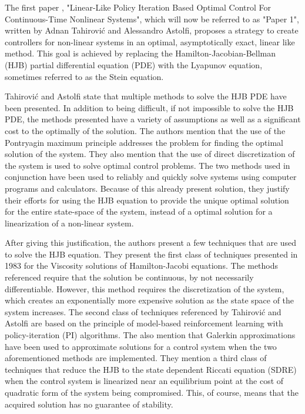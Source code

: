 \documentclass{IEEEtran}
\begin{document}
The first paper \cite{9029697}, "Linear-Like Policy Iteration Based Optimal Control For Continuous-Time Nonlinear Systems", which will now be referred to as "Paper 1", written by Adnan Tahirović and Alessandro Astolfi, proposes a strategy to create controllers for non-linear systems in an optimal, asymptotically exact, linear like method. This goal is achieved by replacing the Hamilton-Jacobian-Bellman (HJB) partial differential equation (PDE) with the Lyapunov equation, sometimes referred to as the Stein equation.

Tahirović and Astolfi state that multiple methods to solve the HJB PDE have been presented. In addition to being difficult, if not impossible to solve the HJB PDE, the methods presented have a variety of assumptions as well as a significant cost to the optimally of the solution. The authors mention that the use of the Pontryagin maximum principle addresses the problem for finding the optimal solution of the system. They also mention that the use of direct discretization of the system is used to solve optimal control problems. The two methods used in conjunction have been used to reliably and quickly solve systems using computer programs and calculators. Because of this already present solution, they justify their efforts for using the HJB equation to provide the unique optimal solution for the entire state-space of the system, instead of a optimal solution for a linearization of a non-linear system.

After giving this justification, the authors present a few techniques that are used to solve the HJB equation. They present the first class of techniques presented in 1983 for the Viscosity solutions of Hamilton-Jacobi equations. The methods referenced require that the solution be continuous, by not necessarily differentiable. However, this method requires the discretization of the system, which creates an exponentially more expensive solution as the state space of the system increases. The second class of techniques referenced by Tahirović and Astolfi are based on the principle of model-based reinforcement learning with policy-iteration (PI) algorithms. The also mention that Galerkin approximations have been used to approximate solutions for a control system when the two aforementioned methods are implemented. They mention a third class of techniques that reduce the HJB to the state dependent Riccati equation (SDRE) when the control system is linearized near an equilibrium point at the cost of quadratic form of the system being compromised. This, of course, means that the acquired solution has no guarantee of stability.
\end{document}
